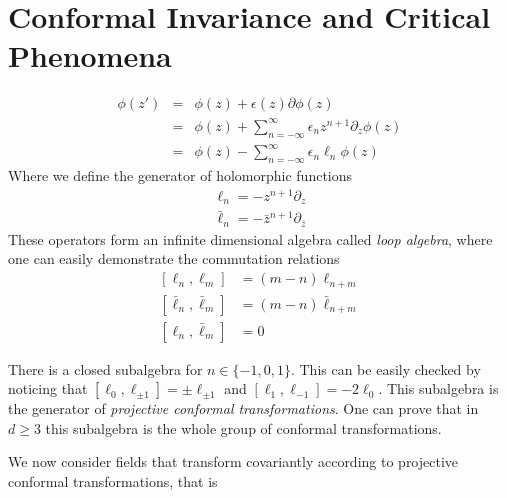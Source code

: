 \chapter{Conformal Invariance and Critical Phenomena}
\label{ch:conf}

\newcommand{\G}{
    \left\langle
        \phi_{1}\left(z_{1},\bar{z}_{1}\right)
        \phi_{2}\left(z_{2},\bar{z}_{2}\right)\ldots
    \right\rangle
}


\begin{eqnarray*}
    \phi\left(z'\right) & = & \phi\left(z\right)+
                              \epsilon\left(z\right)\partial\phi\left(z\right)\\
                        & = & \phi\left(z\right)+
                              \sum_{n=-\infty}^{\infty}\epsilon_{n}z^{n+1}
                              \partial_{z}\phi\left(z\right)\\
                        & = & \phi\left(z\right)-
                              \sum_{n=-\infty}^{\infty}\epsilon_{n}\ell_{n}
                              \phi\left(z\right)
\end{eqnarray*}
Where we define the generator of holomorphic functions
\begin{align*}
    \ell_{n}=-z^{n+1}\partial_{z} \\
    \bar{\ell}_{n}=-\bar{z}^{n+1}\partial_{\bar{z}}
\end{align*}
These operators form an infinite dimensional algebra called \textit{loop
algebra}, where one can easily demonstrate the commutation relations
\begin{align}
    \left[\ell_{n},\ell_{m}\right]&=(m-n)\ell_{n+m}\\
    \left[\bar{\ell}_{n},\bar{\ell}_{m}\right]&=(m-n)\bar{\ell}_{n+m}\\
    \left[\ell_{n},\bar{\ell}_{m}\right]&=0
\end{align}

There is a closed subalgebra for $n\in\{-1, 0, 1\}$. This can be easily checked
by noticing that $[\ell_0,\ell_{\pm 1}] = \pm\ell_{\pm 1}$ and $[\ell_1,
\ell_{-1}] = -2\ell_0$. This subalgebra is the generator of \textit{projective
conformal transformations}. One can prove that in $d\ge3$ this subalgebra
is the whole group of conformal transformations.

We now consider fields that transform covariantly according to projective
conformal transformations, that is

